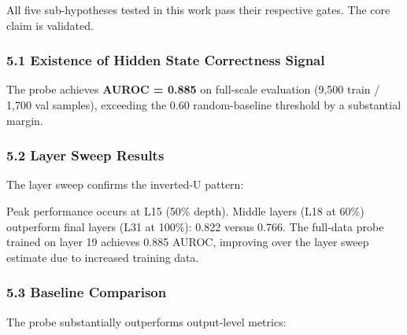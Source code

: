 
All five sub-hypotheses tested in this work pass their respective gates. The core claim is validated.

\subsubsection{5.1 Existence of Hidden State Correctness Signal}

The probe achieves \textbf{AUROC = 0.885} on full-scale evaluation (9,500 train / 1,700 val samples), exceeding the 0.60 random-baseline threshold by a substantial margin.

\subsubsection{5.2 Layer Sweep Results}

The layer sweep confirms the inverted-U pattern:

\begin{table}[htbp]
\centering
{}
\end{table}

Peak performance occurs at L15 (50\% depth). Middle layers (L18 at 60\%) outperform final layers (L31 at 100\%): 0.822 versus 0.766. The full-data probe trained on layer 19 achieves 0.885 AUROC, improving over the layer sweep estimate due to increased training data.

\subsubsection{5.3 Baseline Comparison}

The probe substantially outperforms output-level metrics:

